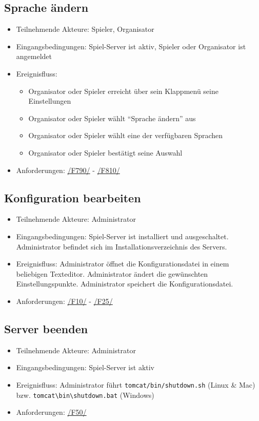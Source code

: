 \documentclass[a4paper]{scrreprt}
\begin{document}
    \subsection{Sprache ändern}
    \begin{itemize}
    \item Teilnehmende Akteure: \Gls{Spieler}, \Gls{Organisator}
    \item Eingangsbedingungen: \Gls{Spiel-Server} ist aktiv, \Gls{Spieler} oder \Gls{Organisator} ist angemeldet
    \item Ereignisfluss:
        \begin{itemize}
            \item \Gls{Organisator} oder \Gls{Spieler} erreicht über sein Klappmenü seine Einstellungen
            \item \Gls{Organisator} oder \Gls{Spieler} wählt \enquote{Sprache ändern} aus
            \item \Gls{Organisator} oder \Gls{Spieler} wählt eine der verfügbaren Sprachen
            \item \Gls{Organisator} oder \Gls{Spieler} bestätigt seine Auswahl
        \end{itemize}
        \item Anforderungen: \hyperlink{F790}{/F790/} - \hyperlink{F810}{/F810/}
    \end{itemize}

    \subsection{Konfiguration bearbeiten}
    \begin{itemize}
        \item Teilnehmende Akteure: \Gls{Administrator}
        \item Eingangsbedingungen: \Gls{Spiel-Server} ist installiert und ausgeschaltet.
        \Gls{Administrator} befindet sich im Installationsverzeichnis des Servers.
        \item Ereignisfluss: \Gls{Administrator} öffnet die Konfigurationsdatei in einem beliebigen Texteditor.
        \Gls{Administrator} ändert die gewünschten Einstellungspunkte.
        \Gls{Administrator} speichert die Konfigurationsdatei.
        \item Anforderungen: \hyperlink{F10}{/F10/} - \hyperlink{F25}{/F25/}
    \end{itemize}

    \subsection{Server beenden}
    \begin{itemize}
        \item Teilnehmende Akteure: \Gls{Administrator}
        \item Eingangsbedingungen: \Gls{Spiel-Server} ist aktiv
        \item Ereignisfluss: \Gls{Administrator} führt \texttt{tomcat/bin/shutdown.sh} (Linux \& Mac) bzw.  \texttt{tomcat\textbackslash bin\textbackslash shutdown.bat} (Windows)
        \item Anforderungen: \hyperlink{F50}{/F50/}
    \end{itemize}
\end{document}
